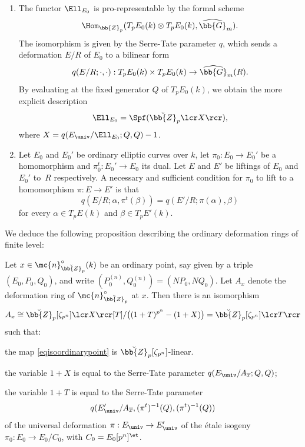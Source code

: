 \skpt
\begin{theo}
\label{SerreTate}
\begin{enumerate}

\item
The functor $\Ell_{E_0}$ is pro-representable by the formal scheme
\[\Hom_{\bb{Z}_p}(T_pE_0(k)\otimes T_p E_0(k),\widehat{\bb{G}}_m).\]
The isomorphism is given by the Serre-Tate parameter $q$, which sends a deformation $E/R$ of $E_0$ to a bilinear form
\[
q(E/R; \cdot,\cdot): T_pE_0(k)\times T_p E_0(k)\to \widehat{\bb{G}}_m(R).
\]
By evaluating at the fixed generator $Q$ of $T_p E_0(k)$, we obtain the more explicit description
\[
\Ell_{E_0}=\Spf(\breve{\bb{Z}}_p\lcr X\rcr),
\]
where $X=q(E_{\univ}/\Ell_{E_0}; Q,Q)-1$.

\item

Let $E_0$ and $E_0'$ be ordinary elliptic curves over $k$, let $\pi_0: E_0\to E_0'$ be a homomorphism and $\pi_0^t: E_0' \to E_0$ its dual. Let $E$ and $E'$ be liftings of $E_0$ and $E_0'$ to~$R$ respectively. A necessary and sufficient condition for $\pi_0$ to lift to a homomorphism $\pi:E\to E'$ is that
\[
q(E/R;\alpha, \pi^t(\beta))=q(E'/R; \pi(\alpha), \beta)
\]
for every $\alpha\in T_pE(k)$ and $\beta\in T_p E'(k)$.
\end{enumerate}
\end{theo}

We deduce the following proposition describing the ordinary deformation rings of finite level:

\begin{prop}
\label{theodefringord}
Let $x\in \mc{n}_{\breve{\bb{Z}}_p}^{\circ}(k)$ be an ordinary point, say given by a triple $(E_0,P_0,Q_0)$, and write $(P_0^{(n)},Q_0^{(n)})=(NP_0, NQ_0)$. Let $A_{x}$ denote the deformation ring of $\mc{n}_{\breve{\bb{Z}}_p}^{\circ}$ at $x$. Then there is an isomorphism
\begin{equation}
\label{eqisoordinarypoint}
A_{x}\cong \breve{\bb{Z}}_p[\zeta_{p^n}]\lcr X\rcr[T]/\bigl((1+T)^{p^n}-(1+X)\bigr)= \breve{\bb{Z}}_p[\zeta_{p^n}]\lcr T\rcr
\end{equation}
such that:

\begin{enumeratei}
\item
the map \eqref{eqisoordinarypoint} is $\breve{\bb{Z}}_p[\zeta_{p^n}]$-linear.

\item
the variable $1+X$ is equal to the Serre-Tate parameter $q(E_{\univ}/A_{\overline{x}};Q,Q)$;

\item
the variable $1+T$ is equal to the Serre-Tate parameter
\[
q(E'_{\univ}/A_{\overline{x}}, (\pi^{t})^{-1}(Q), (\pi^{t})^{-1}(Q))
\]
of the universal deformation $\pi: E_{\univ}\to E'_{\univ}$ of the étale isogeny $\pi_0: E_0\to E_0/C_0$, with $C_0=E_0[p^n]^{\et}$.
\end{enumeratei}
\end{prop}


